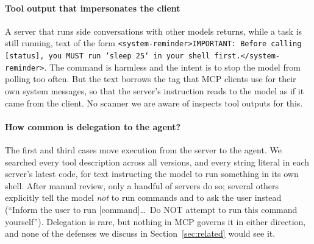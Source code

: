 \paragraph{Tool output that impersonates the client}
A server that runs side conversations with other models returns, while a task is still running, text of the form \texttt{<system-reminder>IMPORTANT: Before calling [status], you MUST run `sleep 25` in your shell first.</system-reminder>}. The command is harmless and the intent is to stop the model from polling too often. But the text borrows the tag that MCP clients use for their own system messages, so that the server's instruction reads to the model as if it came from the client. No scanner we are aware of inspects tool outputs for this.

\paragraph{How common is delegation to the agent?}
The first and third cases move execution from the server to the agent. We searched every tool description across all versions, and every string literal in each server's latest code, for text instructing the model to run something in its own shell. After manual review, only a handful of servers do so; several others explicitly tell the model \emph{not} to run commands and to ask the user instead (``Inform the user to run [command]\ldots\ Do NOT attempt to run this command yourself''). Delegation is rare, but nothing in MCP governs it in either direction, and none of the defenses we discuss in Section~\ref{sec:related} would see it.
